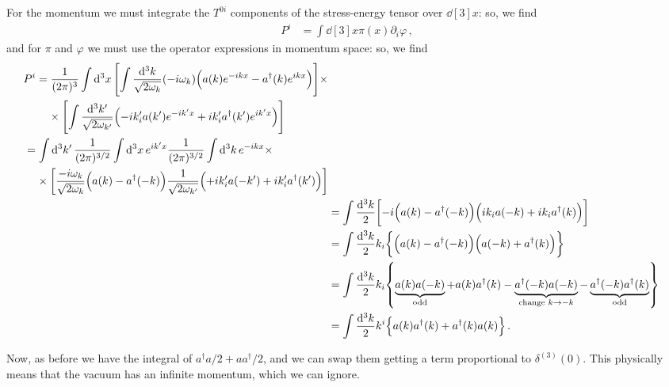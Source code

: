 \documentclass[main.tex]{subfiles}
\begin{document}
For the momentum we must integrate the \(T^{0i}\) components of the stress-energy tensor over \(\dd[3]{x}\): so, we find
%
\begin{align}
P^{i} &= \int \dd[3]{x} \pi (x) \partial_{i} \varphi  
\,,
\end{align}
%
and for \(\pi \) and \(\varphi \) we must use the operator expressions in momentum space: so, we find 
%
\begin{align}
\begin{split}
P^{i}&= \frac{1}{(2 \pi)^3} \int \dd[3]{x} 
\qty[
\int \frac{ \dd[3]{k}}{\sqrt{2 \omega_{k}}} 
(-i \omega_{k}) \qty(a(k) e^{-ikx} - a ^\dag (k) e^{ikx})
] \times  \\
&\phantom{=}\ 
\times \qty[
\int \frac{ \dd[3]{k'}}{\sqrt{2 \omega_{k'}}} 
\qty(-i k_i^{\prime } a(k') e^{-ik'x} +i k_i' a ^\dag (k') e^{ik'x})]
\end{split} \\
\begin{split}
&= \int \dd[3]{k'}
\frac{1}{(2 \pi )^{3/2}} \int \dd[3]{x} e^{ik'x}
\frac{1}{(2 \pi )^{3/2}} \int \dd[3]{k} e^{-ikx} \times \\
&\phantom{=}\ \times
\qty[ \frac{-i \omega_{k}}{\sqrt{2 \omega_{k}}} \qty(a(k) - a ^\dag(-k))
\frac{1}{\sqrt{2 \omega_{k'}}} \qty(+i k_i' a(-k') + i k_i' a ^\dag(k'))
]
\end{split} \\
&= \int \frac{\dd[3]{k}}{2} \qty[-i \qty(a(k) - a ^\dag(-k)) \qty(i k_i a(-k) + i k_i a ^\dag (k))] \\ 
&= \int \frac{\dd[3]{k}}{2} k_i\qty{ \qty(a(k) - a ^\dag(-k) ) \qty(a(-k) + a ^\dag (k))}  \\
&= \int \frac{\dd[3]{k}}{2} k_i \qty{
\underbrace{a(k) a (-k)}_{\text{odd}} + a (k) a ^\dag (k) - \underbrace{a ^\dag (-k) a (-k)}_{\text{change } k \to -k} - \underbrace{a ^\dag(-k) a ^\dag(k)}_{\text{odd}}
}
\\
&= \int \frac{\dd[3]{k}}{2} k^{i} \qty{ a (k) a ^\dag (k) + a ^\dag (k) a (k)}
\,.
\end{align}

Now, as before we have the integral of \(a ^\dag a /2 + a a ^\dag /2\), and we can swap them getting a term proportional to \(\delta^{(3)} (0)\). This physically means that the vacuum has an infinite momentum, which we can ignore. 


\end{document}
